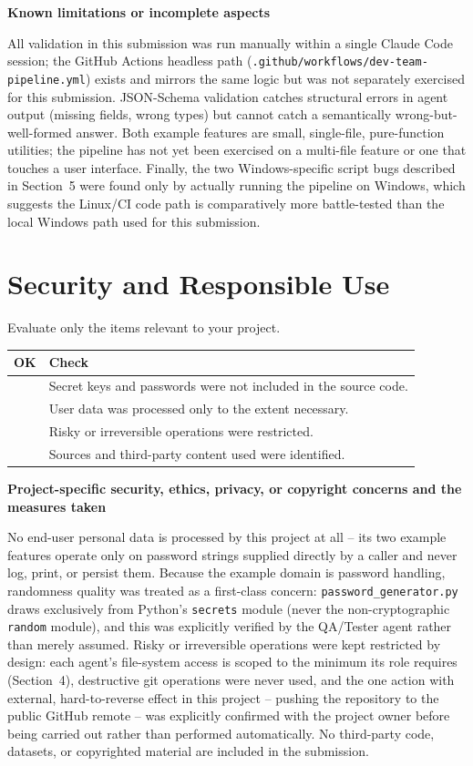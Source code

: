 \documentclass[11pt,a4paper]{article}
\newcommand{\sectionintro}[1]{\textcolor{courseGray}{\small #1}\par\vspace{2pt}}
\newcommand{\answerarea}[2]{\textbf{#1}\par\begin{answerbox}#2\end{answerbox}}
\newcommand{\yes}{\textcolor{courseTeal}{\textbf{\checkmark}}}
\begin{document}
\answerarea{Known limitations or incomplete aspects}{
All validation in this submission was run manually within a single Claude Code session; the
GitHub Actions headless path (\texttt{.github/workflows/dev-team-pipeline.yml}) exists and
mirrors the same logic but was not separately exercised for this submission. JSON-Schema
validation catches structural errors in agent output (missing fields, wrong types) but
cannot catch a semantically wrong-but-well-formed answer. Both example features are small,
single-file, pure-function utilities; the pipeline has not yet been exercised on a
multi-file feature or one that touches a user interface. Finally, the two Windows-specific
script bugs described in Section~5 were found only by actually running the pipeline on
Windows, which suggests the Linux/CI code path is comparatively more battle-tested than the
local Windows path used for this submission.
}

\section{Security and Responsible Use}
\sectionintro{Evaluate only the items relevant to your project.}

\begin{tabularx}{\linewidth}{@{}C{1.0cm}Y@{}}
\toprule
\textbf{OK} & \textbf{Check} \\
\midrule
\yes & Secret keys and passwords were not included in the source code. \\
\yes & User data was processed only to the extent necessary. \\
\yes & Risky or irreversible operations were restricted. \\
\yes & Sources and third-party content used were identified. \\
\bottomrule
\end{tabularx}

\answerarea{Project-specific security, ethics, privacy, or copyright concerns and the measures taken}{
No end-user personal data is processed by this project at all -- its two example features
operate only on password strings supplied directly by a caller and never log, print, or
persist them. Because the example domain is password handling, randomness quality was
treated as a first-class concern: \texttt{password\_generator.py} draws exclusively from
Python's \texttt{secrets} module (never the non-cryptographic \texttt{random} module), and
this was explicitly verified by the QA/Tester agent rather than merely assumed. Risky or
irreversible operations were kept restricted by design: each agent's file-system access is
scoped to the minimum its role requires (Section~4), destructive git operations were never
used, and the one action with external, hard-to-reverse effect in this project -- pushing
the repository to the public GitHub remote -- was explicitly confirmed with the project
owner before being carried out rather than performed automatically. No third-party code,
datasets, or copyrighted material are included in the submission.
}
\end{document}
